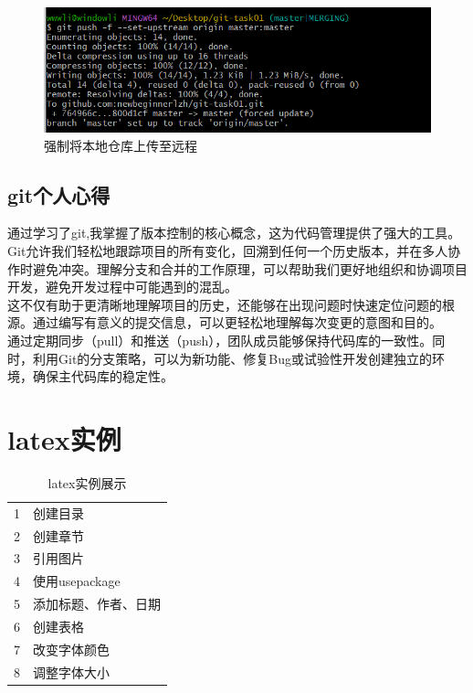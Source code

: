 \documentclass[a4paper, 12pt]{article}
\begin{document}
 \begin{figure}[H]
  \includegraphics[width=1\textwidth]{屏幕截图 2024-08-29 112519.png}
  \caption{强制将本地仓库上传至远程}
    \end{figure}



\subsection{git个人心得}
    {\color{blue}通过学习了git,我掌握了版本控制的核心概念，这为代码管理提供了强大的工具。}Git允许我们轻松地跟踪项目的所有变化，回溯到任何一个历史版本，并在多人协作时避免冲突。理解分支和合并的工作原理，可以帮助我们更好地组织和协调项目开发，避免开发过程中可能遇到的混乱。
    \\
    这不仅有助于更清晰地理解项目的历史，还能够在出现问题时快速定位问题的根源。通过编写有意义的提交信息，可以更轻松地理解每次变更的意图和目的。
\\
    通过定期同步（pull）和推送（push），团队成员能够保持代码库的一致性。同时，利用Git的分支策略，可以为新功能、修复Bug或试验性开发创建独立的环境，确保主代码库的稳定性。

\section{latex实例}
\begin{table}[H]
\centering
\caption{ {\color{red}latex实例展示}}
\begin{tabular}{cl}
1&创建目录    \\
2 & 创建章节   \\
3&引用图片   \\
4& 使用usepackage   \\
5&添加标题、作者、日期  \\
6&创建表格  \\
7&改变字体颜色   \\
8&调整字体大小   
\end{tabular}
\end{table}
\end{document}
